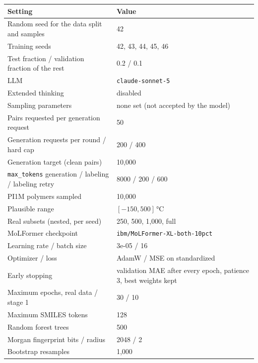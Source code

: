 \begin{tabular}{@{}ll@{}}
\toprule
Setting & Value \\
\midrule
Random seed for the data split and samples & 42 \\
Training seeds & 42, 43, 44, 45, 46 \\
Test fraction / validation fraction of the rest & 0.2 / 0.1 \\
LLM & \texttt{claude-sonnet-5} \\
Extended thinking & disabled \\
Sampling parameters & none set (not accepted by the model) \\
Pairs requested per generation request & 50 \\
Generation requests per round / hard cap & 200 / 400 \\
Generation target (clean pairs) & 10,000 \\
\texttt{max\_tokens} generation / labeling / labeling retry & 8000 / 200 / 600 \\
PI1M polymers sampled & 10,000 \\
Plausible \Tg{} range & $[-150, 500]$\,\unit{\celsius} \\
Real subsets (nested, per seed) & 250, 500, 1,000, full \\
MoLFormer checkpoint & \texttt{ibm/MoLFormer-XL-both-10pct} \\
Learning rate / batch size & 3e-05 / 16 \\
Optimizer / loss & AdamW / MSE on standardized \Tg{} \\
Early stopping & validation MAE after every epoch, patience 3, best weights kept \\
Maximum epochs, real data / stage 1 & 30 / 10 \\
Maximum SMILES tokens & 128 \\
Random forest trees & 500 \\
Morgan fingerprint bits / radius & 2048 / 2 \\
Bootstrap resamples & 1,000 \\
\bottomrule
\end{tabular}
